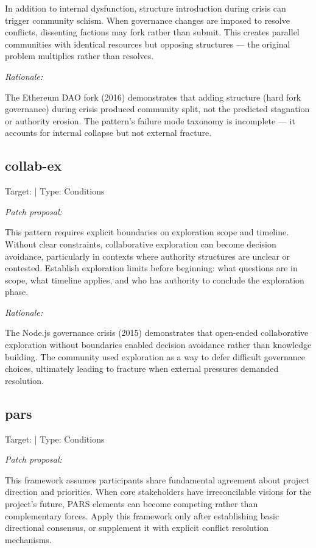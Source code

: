 \documentclass[11pt,a4paper]{article}
\begin{document}
In addition to internal dysfunction, structure introduction during crisis can trigger community schism. When governance changes are imposed to resolve conflicts, dissenting factions may fork rather than submit. This creates parallel communities with identical resources but opposing structures — the original problem multiplies rather than resolves.

\textit{Rationale:}

The Ethereum DAO fork (2016) demonstrates that adding structure (hard fork governance) during crisis produced community split, not the predicted stagnation or authority erosion. The pattern's failure mode taxonomy is incomplete — it accounts for internal collapse but not external fracture.

\subsection{collab-ex}
Target: \texttt{} | Type: Conditions

\textit{Patch proposal:}

This pattern requires explicit boundaries on exploration scope and timeline. Without clear constraints, collaborative exploration can become decision avoidance, particularly in contexts where authority structures are unclear or contested. Establish exploration limits before beginning: what questions are in scope, what timeline applies, and who has authority to conclude the exploration phase.

\textit{Rationale:}

The Node.js governance crisis (2015) demonstrates that open-ended collaborative exploration without boundaries enabled decision avoidance rather than knowledge building. The community used exploration as a way to defer difficult governance choices, ultimately leading to fracture when external pressures demanded resolution.

\subsection{pars}
Target: \texttt{} | Type: Conditions

\textit{Patch proposal:}

This framework assumes participants share fundamental agreement about project direction and priorities. When core stakeholders have irreconcilable visions for the project's future, PARS elements can become competing rather than complementary forces. Apply this framework only after establishing basic directional consensus, or supplement it with explicit conflict resolution mechanisms.
\end{document}
